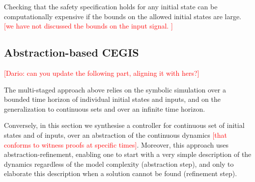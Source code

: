 \documentclass[twocolumn]{autart}    %
\renewcommand{\note}[1]{\textcolor{red}{[#1]}}
\begin{document}
Checking that the safety specification holds for any initial state can be
computationally expensive if the bounds on the allowed initial states are
large. \note{we have not discussed the bounds on the input signal. }

\subsection{Abstraction-based CEGIS} 
\label{sssec:abstraction}

\textcolor{red}{[Dario: can you update the following part, aligning it with hers?]}


The multi-staged approach above relies on the symbolic simulation over a bounded time horizon of individual initial states and inputs, 
and on the generalization to continuous sets and over an infinite time horizon. 





Conversely, in this section we synthesise a controller for continuous set of initial states and of inputs, 
over an abstraction of the continuous dynamics \cite{cattaruzza2015unbounded} \note{that conforms to witness proofs at specific times}.   
Moreover, this approach uses abstraction-refinement, 
enabling one to start with a very simple description of the dynamics regardless of the model complexity (abstraction step), 
and only to elaborate this description 
when a solution cannot be found (refinement step). 
\end{document}
